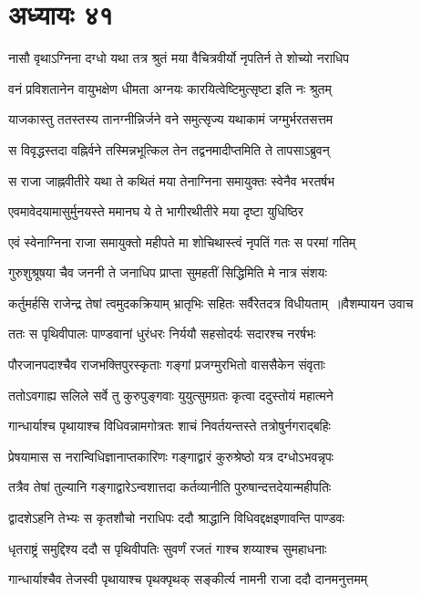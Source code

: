 \chapter{अध्यायः ४१}
\twolineshloka
{नासौ वृथाऽग्निना दग्धो यथा तत्र श्रुतं मया}
{वैचित्रवीर्यो नृपतिर्न ते शोच्यो नराधिप}


\twolineshloka
{वनं प्रविशतानेन वायुभक्षेण धीमता}
{अग्नयः कारयित्वेष्टिमुत्सृष्टा इति नः श्रुतम्}


\twolineshloka
{याजकास्तु ततस्तस्य तानग्नीन्निर्जने वने}
{समुत्सृज्य यथाकामं जग्मुर्भरतसत्तम}


\twolineshloka
{स विवृद्धस्तदा वह्निर्वने तस्मिन्नभूत्किल}
{तेन तद्वनमादीप्तमिति ते तापसाऽब्रुवन्}


\twolineshloka
{स राजा जाह्नवीतीरे यथा ते कथितं मया}
{तेनाग्निना समायुक्तः स्वेनैव भरतर्षभ}


\twolineshloka
{एवमावेदयामासुर्मुनयस्ते ममानघ}
{ये ते भागीरथीतीरे मया दृष्टा युधिष्ठिर}


\twolineshloka
{एवं स्वेनाग्निना राजा समायुक्तो महीपते}
{मा शोचिथास्त्वं नृपतिं गतः स परमां गतिम्}


\twolineshloka
{गुरुशुश्रूषया चैव जननी ते जनाधिप}
{प्राप्ता सुमहतीं सिद्धिमिति मे नात्र संशयः}


\threelineshloka
{कर्तुमर्हसि राजेन्द्र तेषां त्वमुदकक्रियाम्}
{भ्रातृभिः सहितः सर्वैरेतदत्र विधीयताम् ॥वैशम्पायन उवाच}
{}


\twolineshloka
{ततः स पृथिवीपालः पाण्डवानां धुरंधरः}
{निर्ययौ सहसोदर्यः सदारश्च नरर्षभः}


\twolineshloka
{पौरजानपदाश्चैव राजभक्तिपुरस्कृताः}
{गङ्गां प्रजग्मुरभितो वाससैकेन संवृताः}


\twolineshloka
{ततोऽवगाह्य सलिले सर्वे तु कुरुपुङ्गवाः}
{युयुत्सुमग्रतः कृत्वा ददुस्तोयं महात्मने}


\twolineshloka
{गान्धार्याश्च पृथायाश्च विधिवन्नामगोत्रतः}
{शाचं निवर्तयन्तस्ते तत्रोषुर्नगराद्बहिः}


\threelineshloka
{प्रेषयामास स नरान्विधिज्ञानाप्तकारिणः}
{गङ्गाद्वारं कुरुश्रेष्ठो यत्र दग्धोऽभवन्नृपः}
{}


\twolineshloka
{तत्रैव तेषां तुल्यानि गङ्गाद्वारेऽन्वशात्तदा}
{कर्तव्यानीति पुरुषान्दत्तदेयान्महीपतिः}


\twolineshloka
{द्वादशेऽहनि तेभ्यः स कृतशौचो नराधिपः}
{ददौ श्राद्धानि विधिवद्दक्षइणावन्ति पाण्डवः}


\twolineshloka
{धृतराष्ट्रं समुद्दिश्य ददौ स पृथिवीपतिः}
{सुवर्णं रजतं गाश्च शय्याश्च सुमहाधनाः}


\twolineshloka
{गान्धार्याश्चैव तेजस्वी पृथायाश्च पृथक्पृथक्}
{सङ्कीर्त्य नामनी राजा ददौ दानमनुत्तमम्}


